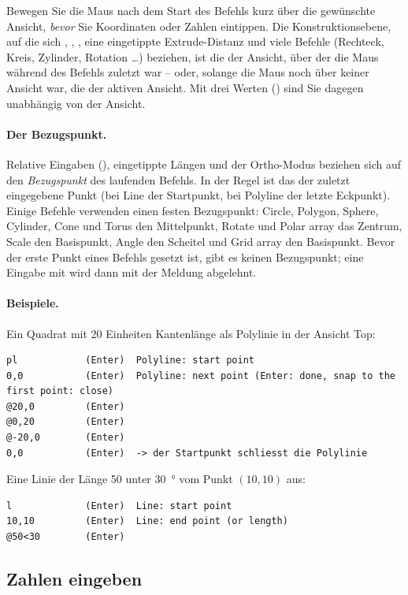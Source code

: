 \begin{tipp}
Bewegen Sie die Maus nach dem Start des Befehls kurz über die gewünschte Ansicht, \emph{bevor}
Sie Koordinaten oder Zahlen eintippen. Die Konstruktionsebene, auf die sich ,
, , eine eingetippte Extrude-Distanz und viele Befehle (Rechteck, Kreis,
Zylinder, Rotation \ldots) beziehen, ist die der Ansicht, über der die Maus während des Befehls
zuletzt war -- oder, solange die Maus noch über keiner Ansicht war, die der aktiven Ansicht. Mit
drei Werten () sind Sie dagegen unabhängig von der Ansicht.
\end{tipp}

\paragraph{Der Bezugspunkt.}
Relative Eingaben (), eingetippte Längen und der Ortho-Modus beziehen sich auf den
\emph{Bezugspunkt} des laufenden Befehls. In der Regel ist das der zuletzt eingegebene Punkt
(bei Line der Startpunkt, bei Polyline der letzte Eckpunkt). Einige Befehle verwenden einen
festen Bezugspunkt: Circle, Polygon, Sphere, Cylinder, Cone und Torus den Mittelpunkt, Rotate
und Polar array das Zentrum, Scale den Basispunkt, Angle den Scheitel und Grid array den
Basispunkt. Bevor der erste Punkt eines Befehls gesetzt ist, gibt es keinen Bezugspunkt; eine
Eingabe mit  wird dann mit der Meldung 
abgelehnt.

\paragraph{Beispiele.}
Ein Quadrat mit 20 Einheiten Kantenlänge als Polylinie in der Ansicht Top:
\begin{lstlisting}
pl            (Enter)  Polyline: start point
0,0           (Enter)  Polyline: next point (Enter: done, snap to the first point: close)
@20,0         (Enter)
@0,20         (Enter)
@-20,0        (Enter)
0,0           (Enter)  -> der Startpunkt schliesst die Polylinie
\end{lstlisting}
Eine Linie der Länge 50 unter \SI{30}{\degree} vom Punkt $(10,10)$ aus:
\begin{lstlisting}
l             (Enter)  Line: start point
10,10         (Enter)  Line: end point (or length)
@50<30        (Enter)
\end{lstlisting}

\subsection{Zahlen eingeben}\label{sec:zahleneingabe}

